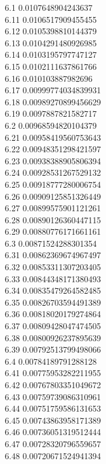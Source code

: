 {6.1	0.0107648904243637\\
6.11	0.0106517909455455\\
6.12	0.0105398810144379\\
6.13	0.0104291480926985\\
6.14	0.0103195797747127\\
6.15	0.0102111637861766\\
6.16	0.010103887982696\\
6.17	0.00999774034839931\\
6.18	0.00989270899456629\\
6.19	0.0097887821582717\\
6.2	0.00968594820104379\\
6.21	0.00958419560753643\\
6.22	0.00948351298421597\\
6.23	0.00938388905806394\\
6.24	0.00928531267529132\\
6.25	0.00918777280006754\\
6.26	0.00909125851326449\\
6.27	0.00899575901121261\\
6.28	0.00890126360447115\\
6.29	0.00880776171661161\\
6.3	0.00871524288301354\\
6.31	0.00862369674967497\\
6.32	0.00853311307203405\\
6.33	0.00844348171380493\\
6.34	0.00835479264582485\\
6.35	0.00826703594491389\\
6.36	0.00818020179274864\\
6.37	0.00809428047474505\\
6.38	0.00800926237895639\\
6.39	0.00792513799498066\\
6.4	0.00784189791288128\\
6.41	0.00775953282211955\\
6.42	0.00767803351049672\\
6.43	0.00759739086310961\\
6.44	0.00751759586131653\\
6.45	0.00743863958171389\\
6.46	0.00736051319512444\\
6.47	0.00728320796559657\\
6.48	0.00720671524941394\\
}
